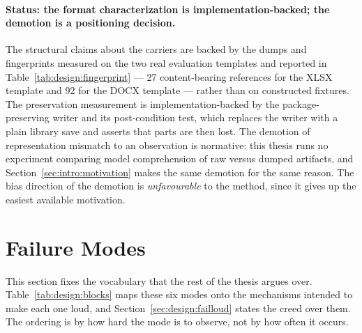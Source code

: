 \paragraph{Status: the format characterization is implementation-backed; the demotion is a
positioning decision.}
The structural claims about the carriers are backed by the dumps and fingerprints measured on
the two real evaluation templates and reported in Table~\ref{tab:design:fingerprint} --- 27
content-bearing references for the XLSX template and 92 for the DOCX template --- rather than
on constructed fixtures. The preservation measurement is implementation-backed by the
package-preserving writer and its post-condition test, which replaces the writer with a plain
library save and asserts that parts are then lost. The demotion of representation mismatch to
an observation is normative: this thesis runs no experiment comparing model comprehension of
raw versus dumped artifacts, and Section~\ref{sec:intro:motivation} makes the same demotion for
the same reason. The bias direction of the demotion is \emph{unfavourable} to the method, since
it gives up the easiest available motivation.

\section{Failure Modes}
\label{sec:rel:failures}

This section fixes the vocabulary that the rest of the thesis argues over.
Table~\ref{tab:design:blocks} maps these six modes onto the mechanisms intended to make each
one loud, and Section~\ref{sec:design:failloud} states the creed over them. The ordering is by
how hard the mode is to observe, not by how often it occurs.

